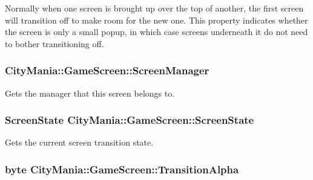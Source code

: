 Normally when one screen is brought up over the top of another, the first screen will transition off to make room for the new one. This property indicates whether the screen is only a small popup, in which case screens underneath it do not need to bother transitioning off. \hypertarget{classCityMania_1_1GameScreen_ac15df0115281ac945ef2f4d30daa68d5}{
\subsubsection[{ScreenManager}]{ CityMania::GameScreen::ScreenManager}}
\label{classCityMania_1_1GameScreen_ac15df0115281ac945ef2f4d30daa68d5}


Gets the manager that this screen belongs to. \hypertarget{classCityMania_1_1GameScreen_af7771d5fc80b7cf95ad3aa1ac74b54f5}{
\subsubsection[{ScreenState}]{\setlength{\rightskip}{0pt plus 5cm}ScreenState CityMania::GameScreen::ScreenState}}
\label{classCityMania_1_1GameScreen_af7771d5fc80b7cf95ad3aa1ac74b54f5}


Gets the current screen transition state. \hypertarget{classCityMania_1_1GameScreen_ac874b0c2bc737aba6a017e24fa564d74}{
\subsubsection[{TransitionAlpha}]{\setlength{\rightskip}{0pt plus 5cm}byte CityMania::GameScreen::TransitionAlpha}}
\label{classCityMania_1_1GameScreen_ac874b0c2bc737aba6a017e24fa564d74}


